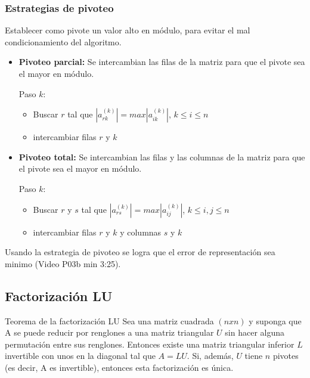 \documentclass[../main.tex]{subfiles}
\begin{document}
        \subsubsection{Estrategias de pivoteo}
            Establecer como pivote un valor alto en módulo, para evitar el mal condicionamiento del algoritmo.
            \begin{itemize}
                \item \textbf{Pivoteo parcial:} 
                    Se intercambian las filas de la matriz para que el pivote sea el mayor en módulo.
                    
                    Paso $k$:
                    \begin{itemize}
                        \item Buscar $r$ tal que $|a_{rk}^{(k)}| = max|a_{ik}^{(k)}|$, $k \leq  i \leq n $
                        \item intercambiar filas $r$ y $k$
                    \end{itemize}

                    
                \item \textbf{Pivoteo total:} 
                    Se intercambian las filas y las columnas de la matriz para que el pivote sea el mayor en módulo.

                    Paso $k$:
                    \begin{itemize}
                        \item Buscar $r$ y $s$ tal que $|a_{rs}^{(k)}| = max|a_{ij}^{(k)}|$, $k \leq  i,j \leq n $
                        \item intercambiar filas $r$ y $k$ y columnas $s$ y $k$
                    \end{itemize}

            \end{itemize}

            Usando la estrategia de pivoteo se logra que el error de representación sea minimo (Video P03b min 3:25).
    \subsection{Factorización LU}
        \begin{teorema}{Teorema de la factorización LU}{}
            Sea una matriz cuadrada $(nxn)$ y suponga que A se puede reducir por renglones a
            una matriz triangular $U$ sin hacer alguna permutación entre sus renglones. Entonces
            existe una matriz triangular inferior $L$ invertible con unos en la diagonal tal que $A = LU$. Si, además, $U$ tiene $n$ pivotes (es decir, A es invertible), entonces esta factorización es única.
        \end{teorema}
\end{document}
